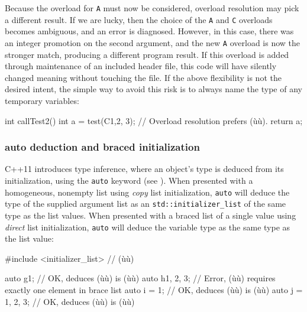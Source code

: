 \noindent Because the overload for \lstinline!A! must now be considered, overload
resolution may pick a different result. If we are lucky, then the choice
of the \lstinline!A! and \lstinline!C! overloads becomes ambiguous, and an
error is diagnosed. However, in this case, there was an integer
promotion on the second argument, and the new \lstinline!A! overload is now
the stronger match, producing a different program result. If this
overload is added through maintenance of an included header file, this
code will have silently changed meaning without touching the file. If
the above flexibility is not the desired intent, the simple way to avoid
this risk is to always name the type of any temporary variables:

\begin{emcppslisting}[emcppsbatch=e23]
int callTest2()
{
    int a = test(C{1,2}, 3);  // Overload resolution prefers (ù{}ù).
    return a;
}
\end{emcppslisting}
    

\subsubsection[\lstinline!auto! deduction and braced initialization]{{\SubsubsecCode auto} deduction and braced initialization}\label{auto-deduction-and-braced-initialization}

C++11 introduces type inference, where an object's type is deduced from
its initialization, using the \lstinline!auto! keyword (see ). When presented with a homogeneous, nonempty list using
\emph{copy} list initialization, \lstinline!auto! will deduce the type of
the supplied argument list as an \lstinline!std::initializer_list! of the
same type as the list values. When presented with a braced list of a
single value using \emph{direct} list initialization, \lstinline!auto! will
deduce the variable type as the same type as the list value:

\begin{emcppslisting}
#include <initializer_list>  // (ù{}ù)

auto g{1};         // OK, deduces (ù{}ù) is (ù{}ù)
auto h{1, 2, 3};     // Error, (ù{}ù) requires exactly one element in brace list
auto i = {1};      // OK, deduces (ù{}ù) is (ù{}ù)
auto j = {1, 2, 3};  // OK, deduces (ù{}ù) is (ù{}ù)
\end{emcppslisting}
    

